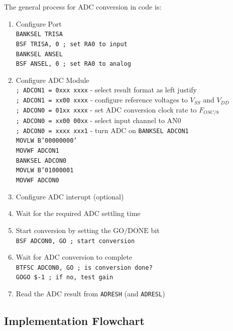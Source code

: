 \documentclass[11pt]{article}
\begin{document}
The general process for ADC conversion in code is:
\begin{enumerate}
\item Configure Port\\
	\texttt{BANKSEL  TRISA}\\
	\texttt{BSF      TRISA, 0	; set RA0 to input}\\
	\texttt{BANKSEL  ANSEL}\\
	\texttt{BSF      ANSEL, 0	; set RA0 to analog}
\item Configure ADC Module\\
	\texttt{; ADCON1 = 0xxx xxxx}	- select result format as left justify\\
	\texttt{; ADCON1 = xx00 xxxx}	- configure reference voltages to $V_{SS}$ and $V_{DD}$\\
	\texttt{; ADCON0 = 01xx xxxx}	- set ADC conversion clock rate to $F_{OSC/8}$\\
	\texttt{; ADCON0 = xx00 00xx}	- select input channel to AN0\\
	\texttt{; ADCON0 = xxxx xxx1}	- turn ADC on
	\texttt{BANKSEL  ADCON1}\\
	\texttt{MOVLW    B'00000000'}\\
	\texttt{MOVWF    ADCON1}\\
	\texttt{BANKSEL  ADCON0}\\
	\texttt{MOVLW    B'01000001}\\
	\texttt{MOVWF    ADCON0}\\
\item Configure ADC interupt (optional)
\item Wait for the required ADC settling time
\item Start conversion by setting the $\textrm{GO}/\overline{\textrm{DONE}}$ bit\\
	\texttt{BSF      ADCON0, GO     ; start conversion}
\item Wait for ADC conversion to complete\\
	\texttt{BTFSC    ADCON0, GO     ; is conversion done?}\\
	\texttt{GOGO     \$-1           ; if no, test gain}
\item Read the ADC result from \texttt{ADRESH} (and \texttt{ADRESL})
\end{enumerate}

\subsection{Implementation Flowchart}
\end{document}
